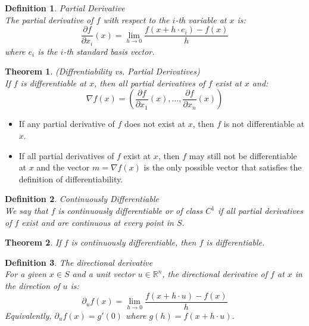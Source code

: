 \documentclass[11pt]{book} %
\newtheorem{theorem}{Theorem}[section]
\newtheorem{definition}{Definition}[section]
\begin{document}
\bigbreak

\begin{definition}{Partial Derivative} \\
The partial derivative of $f$ with respect to the $i$-th variable at $x$ is:
\begin{equation}
    \frac{\partial f}{\partial x_i}(x) = \lim_{h \rightarrow 0} \frac{f(x + h \cdot e_i) - f(x)}{h}
\end{equation}
where $e_i$ is the $i$-th standard basis vector.
\end{definition}

\bigbreak

\begin{theorem}(Diffrentiability vs. Partial Derivatives) \\
If $f$ is differentiable at $x$, then all partial derivatives of $f$ exist at $x$ and:
\begin{equation}
    \nabla f(x) = \left( \frac{\partial f}{\partial x_1}(x), \ldots, \frac{\partial f}{\partial x_n}(x) \right)
\end{equation}    
\end{theorem}

\bigbreak

\begin{itemize}
    \item If any partial derivative of $f$ does not exist at $x$, then $f$ is not differentiable at $x$.
    \item If all partial derivatives of $f$ exist at $x$, then $f$ may still not be differentiable at $x$ 
    and the vector $m = \nabla f(x)$ is the only possible vector that satisfies the definition of differentiability.
\end{itemize}

\bigbreak

\begin{definition}{Continuously Differentiable} \\
We say that $f$ is continuously differentiable or of class $C^1$  if all partial derivatives of $f$ exist and are continuous at every point in $S$.
\end{definition}

\bigbreak

\begin{theorem}
If $f$ is continuously differentiable, then $f$ is differentiable.
\end{theorem}

\bigbreak

\begin{definition}{The directional derivative} \\
For a given $x \in S$ and a unit vector $u \in \mathbb{R}^n$, the directional derivative of $f$ at $x$ in the direction of $u$ is:
\begin{equation}
    \partial_u f(x) = \lim_{h \rightarrow 0} \frac{f(x + h \cdot u) - f(x)}{h}
\end{equation}
Equivalently, $\partial_u f(x) = g'(0)$ where $g(h) = f(x + h \cdot u)$.
\end{definition}
\end{document}
